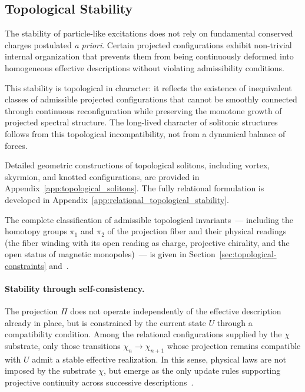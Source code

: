 \subsection{Topological Stability}
  \label{subsec:topological-stability}

  The stability of particle-like excitations does not rely on fundamental
  conserved charges postulated \emph{a priori}.
  Certain projected configurations exhibit non-trivial internal organization
  that prevents them from being continuously deformed into homogeneous
  effective descriptions without violating admissibility conditions.

  This stability is topological in character: it reflects the existence of
  inequivalent classes of admissible projected configurations that cannot be
  smoothly connected through continuous reconfiguration while preserving
  the monotone growth of projected spectral structure.
  The long-lived character of solitonic structures follows from this
  topological incompatibility, not from a dynamical balance of forces.

  Detailed geometric constructions of topological solitons, including
  vortex, skyrmion, and knotted configurations, are provided in
  Appendix~\ref{app:topological_solitons}.
  The fully relational formulation is developed in
  Appendix~\ref{app:relational_topological_stability}.

  The complete classification of admissible topological invariants~---
  including the homotopy groups $\pi_1$ and $\pi_2$ of the projection fiber
  and their physical readings (the fiber winding with its open reading as
  charge, projective chirality, and the open status of magnetic monopoles)~--- is given in
  Section~\ref{sec:topological-constraints} and~\cite{Beau2026k}.

  \paragraph{Stability through self-consistency.}
    The projection $\Pi$ does not operate independently of the effective
    description already in place, but is constrained by the current state $U$
    through a compatibility condition.
    Among the relational configurations supplied by the $\chi$ substrate,
    only those transitions $\chi_n \rightarrow \chi_{n+1}$ whose projection
    remains compatible with $U$ admit a stable effective realization.
    In this sense, physical laws are not imposed by the substrate $\chi$, but
    emerge as the only update rules supporting projective continuity across
    successive descriptions~\cite{Beau2026a}.

